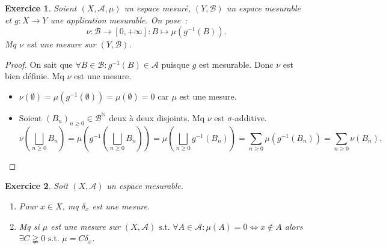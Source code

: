\documentclass{article}
\newtheorem{ex}{Exercice}[section]
\theoremstyle{definition}
\newcommand{\pinfty}{{+\infty}}
\newcommand{\st}{\text{ s.t. }}
\newcommand{\N}{{\mathbb N}}
\begin{document}
\begin{ex} Soient $(X, \mathcal A, \mu)$ un espace mesuré, $(Y, \mathcal B)$ un espace mesurable et $g : X \to Y$ une application mesurable. On pose~:
\[\nu : \mathcal B \to [0, \pinfty] : B \mapsto \mu(g^{-1}(B)).\]
Mq $\nu$ est une mesure sur $(Y, \mathcal B)$.
\end{ex}

\begin{proof} On sait que $\forall B \in \mathcal B : g^{-1}(B) \in \mathcal A$ puisque $g$ est mesurable. Donc $\nu$ est bien définie. Mq $\nu$ est une mesure.
\begin{itemize}
	\item $\nu(\emptyset) = \mu(g^{-1}(\emptyset)) = \mu(\emptyset) = 0$ car $\mu$ est une mesure.
	\item Soient $(B_n)_{n \geq 0} \in \mathcal B^\N$ deux à deux disjoints. Mq $\nu$ est $\sigma$-additive.
	\[\nu\left(\bigsqcup_{n \geq 0}B_n\right) = \mu\left(g^{-1}\left(\bigsqcup_{n \geq 0}B_n\right)\right) = \mu\left(\bigsqcup_{n \geq 0}g^{-1}(B_n)\right)
	  = \sum_{n \geq 0}\mu(g^{-1}(B_n)) = \sum_{n \geq 0}\nu(B_n).\]
\end{itemize}
\end{proof}

\begin{ex} Soit $(X, \mathcal A)$ un espace mesurable.
\begin{enumerate}
	\item Pour $x \in X$, mq $\delta_x$ est une mesure.
	\item Mq si $\mu$ est une mesure sur $(X, \mathcal A) \st \forall A \in \mathcal A : \mu(A) = 0 \iff x \not \in A$ alors $\exists C \gneqq 0 \st \mu = C\delta_x$.
\end{enumerate}
\end{ex}
\end{document}
